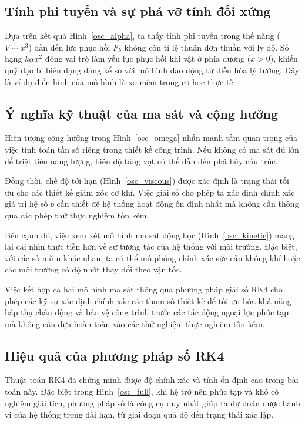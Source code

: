 \subsection{Tính phi tuyến và sự phá vỡ tính đối xứng}
Dựa trên kết quả Hình~\ref{osc_alpha}, ta thấy tính phi tuyến trong thế năng ($V \sim x^3$) dẫn đến lực phục hồi $F_k$ không còn tỉ lệ thuận đơn thuần với ly độ. Số hạng $k\alpha x^2$ đóng vai trò làm yếu lực phục hồi khi vật ở phía dương ($x > 0$), khiến quỹ đạo bị biến dạng đáng kể so với mô hình dao động tử điều hòa lý tưởng. Đây là ví dụ điển hình của mô hình lò xo mềm trong cơ học thực tế.

\subsection{Ý nghĩa kỹ thuật của ma sát và cộng hưởng}
Hiện tượng cộng hưởng trong Hình~\ref{osc_omega} nhấn mạnh tầm quan trọng của việc tính toán tần số riêng trong thiết kế công trình. Nếu không có ma sát đủ lớn để triệt tiêu năng lượng, biên độ tăng vọt có thể dẫn đến phá hủy cấu trúc. 

Đồng thời, chế độ tới hạn (Hình~\ref{osc_viscous}) được xác định là trạng thái tối ưu cho các thiết kế giảm xóc cơ khí. Việc giải số cho phép ta xác định chính xác giá trị hệ số $b$ cần thiết để hệ thống hoạt động ổn định nhất mà không cần thông qua các phép thử thực nghiệm tốn kém.

Bên cạnh đó, việc xem xét mô hình ma sát động học (Hình~\ref{osc_kinetic}) mang lại cái nhìn thực tiễn hơn về sự tương tác của hệ thống với môi trường. Đặc biệt, với các số mũ n khác nhau, ta có thể mô phỏng chính xác sức cản không khí hoặc các môi trường có độ nhớt thay đổi theo vận tốc.

Việc kết hợp cả hai mô hình ma sát thông qua phương pháp giải số RK4 cho phép các kỹ sư xác định chính xác các tham số thiết kế để tối ưu hóa khả năng hấp thụ chấn động và bảo vệ công trình trước các tác động ngoại lực phức tạp mà không cần dựa hoàn toàn vào các thử nghiệm thực nghiệm tốn kém.

\subsection{Hiệu quả của phương pháp số RK4}
Thuật toán RK4 đã chứng minh được độ chính xác và tính ổn định cao trong bài toán này. Đặc biệt trong Hình~\ref{osc_full}, khi hệ trở nên phức tạp và khó có nghiệm giải tích, phương pháp số là công cụ duy nhất giúp ta dự đoán được hành vi của hệ thống trong dài hạn, từ giai đoạn quá độ đến trạng thái xác lập.
